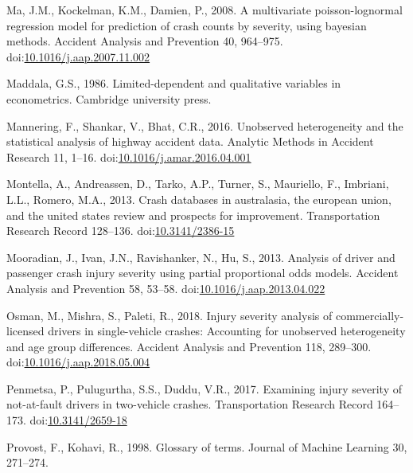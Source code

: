 \documentclass[]{elsarticle} %
\begin{document}
\leavevmode\hypertarget{ref-Ma2008multivariate}{}%
Ma, J.M., Kockelman, K.M., Damien, P., 2008. A multivariate
poisson-lognormal regression model for prediction of crash counts by
severity, using bayesian methods. Accident Analysis and Prevention 40,
964--975.
doi:\href{https://doi.org/10.1016/j.aap.2007.11.002}{10.1016/j.aap.2007.11.002}

\leavevmode\hypertarget{ref-Maddala1986limited}{}%
Maddala, G.S., 1986. Limited-dependent and qualitative variables in
econometrics. Cambridge university press.

\leavevmode\hypertarget{ref-Mannering2016unobserved}{}%
Mannering, F., Shankar, V., Bhat, C.R., 2016. Unobserved heterogeneity
and the statistical analysis of highway accident data. Analytic Methods
in Accident Research 11, 1--16.
doi:\href{https://doi.org/10.1016/j.amar.2016.04.001}{10.1016/j.amar.2016.04.001}

\leavevmode\hypertarget{ref-Montella2013crash}{}%
Montella, A., Andreassen, D., Tarko, A.P., Turner, S., Mauriello, F.,
Imbriani, L.L., Romero, M.A., 2013. Crash databases in australasia, the
european union, and the united states review and prospects for
improvement. Transportation Research Record 128--136.
doi:\href{https://doi.org/10.3141/2386-15}{10.3141/2386-15}

\leavevmode\hypertarget{ref-Mooradian2013analysis}{}%
Mooradian, J., Ivan, J.N., Ravishanker, N., Hu, S., 2013. Analysis of
driver and passenger crash injury severity using partial proportional
odds models. Accident Analysis and Prevention 58, 53--58.
doi:\href{https://doi.org/10.1016/j.aap.2013.04.022}{10.1016/j.aap.2013.04.022}

\leavevmode\hypertarget{ref-Osman2018injury}{}%
Osman, M., Mishra, S., Paleti, R., 2018. Injury severity analysis of
commercially-licensed drivers in single-vehicle crashes: Accounting for
unobserved heterogeneity and age group differences. Accident Analysis
and Prevention 118, 289--300.
doi:\href{https://doi.org/10.1016/j.aap.2018.05.004}{10.1016/j.aap.2018.05.004}

\leavevmode\hypertarget{ref-Penmetsa2017examining}{}%
Penmetsa, P., Pulugurtha, S.S., Duddu, V.R., 2017. Examining injury
severity of not-at-fault drivers in two-vehicle crashes. Transportation
Research Record 164--173.
doi:\href{https://doi.org/10.3141/2659-18}{10.3141/2659-18}

\leavevmode\hypertarget{ref-Provost1998glossary}{}%
Provost, F., Kohavi, R., 1998. Glossary of terms. Journal of Machine
Learning 30, 271--274.
\end{document}
